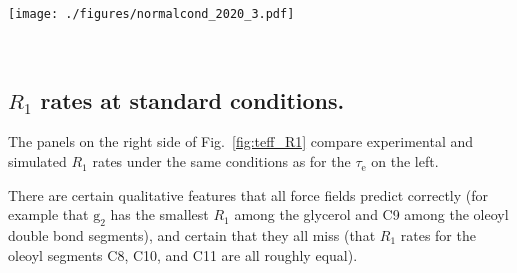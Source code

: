 \documentclass[journal=jpcbfk,manuscript=article,layout=twocolumn]{achemso}
\begin{document}
\begin{figure*}[!ht]
\centering
\texttt{[image: ./figures/normalcond\_2020\_3.pdf]}
\caption{Effective correlation times ($\tau_\mathrm{e}$, left panels) and $R_{1}$ rates (right panels) in experiments (black) and MD simulations (colored) of POPC bilayers in $L_{\alpha}$ phase under full hydration.
Inset on the right shows the POPC structure and carbon segment labeling.
Each plotted value contains contributions from all the hydrogens within its carbon segment; the data for segments 8--11 are only from the sn-2 (oleoyl) chain, whereas the (experimentally non-resolved) contributions of both tails are included for segments 2--3 (2'--3' in the sn-1 chain) and 16--18 (14'--16').
%
Simulation data are only shown for the segments for which there exists experimental data.
%
For $\tau_\mathrm{e}$,
a simulation data point indicates the average over C--H bonds; however,
if $\tau_\mathrm{e}$ could not be determined for all bonds, only the error bar
(extending from the mean of the lower to the mean of the upper error estimates) is shown.
%
The Berger data for methyl segments ($\gamma$, C18, and C16') are left out, because the protonation algorithm used to construct the hydrogens post-simulation in united atom models does not preserve the methyl C--H bond dynamics.
%
Table~\ref{tab:standr} provides further simulation details.
%
Error bars for the experimental values reflect error estimate of {\color{red}XXX}.
}
\label{fig:teff_R1}

\\

\end{figure*}

\subsection*{$R_1$ rates at standard conditions.}
The panels on the right side of Fig.~\ref{fig:teff_R1} compare experimental and simulated $R_{1}$ rates under the same conditions as for the $\tau_\mathrm{e}$ on the left.

There are certain qualitative features that all force fields predict correctly
(for example that $\mathrm g_2$ has the smallest $R_1$ among the glycerol and C9 among the oleoyl double bond segments),
and certain that they all miss (that $R_1$ rates for the oleoyl segments C8, C10, and C11 are all roughly equal).
\end{document}
